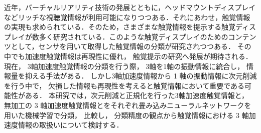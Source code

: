 

\senior  %

\Synopsis

\begin{Abstract}

近年，バーチャルリアリティ技術の発展とともに，ヘッドマウントディスプレイなどリッチな視聴覚情報が利用可能になりつつある．それにあわせ，触覚情報の実現も求められている．そのため，さまざまな触覚情報を提示する触覚ディスプレイが数多く研究されている．このような触覚ディスプレイのためのコンテンツとして，センサを用いて取得した触覚情報の分類が研究されつつある． その中でも加速度触覚情報は再現性に優れ， 触覚提示の研究へ発展が期待される． 
現在， 3軸加速度触覚情報の分類を行う際， 3軸を1軸の振動情報に統合し， 情報量を抑える手法がある． 
しかし3軸加速度情報から 1 軸の振動情報に次元削減を行う中で， 欠損した情報も再現性を考えると触覚情報において重要である可能性がある． 
本研究では，次元削減と正規化を行った3軸加速度触覚情報と， 無加工の 3 軸加速度触覚情報とをそれぞれ畳み込みニューラルネットワークを用いた機械学習で分類， 比較し，  分類精度の観点から触覚情報における 3 軸加速度情報の取扱いについて検討する． 
\end{Abstract}

%
% 





















